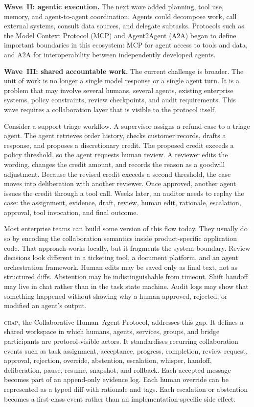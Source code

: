 \documentclass[11pt]{article}
\newcommand{\chap}{\textsc{chap}}
\begin{document}
\textbf{Wave~II: agentic execution.} The next wave added planning, tool use, memory, and agent-to-agent coordination. Agents could decompose work, call external systems, consult data sources, and delegate subtasks. Protocols such as the Model Context Protocol (MCP) and Agent2Agent (A2A) began to define important boundaries in this ecosystem: MCP for agent access to tools and data, and A2A for interoperability between independently developed agents.

\textbf{Wave~III: shared accountable work.} The current challenge is broader. The unit of work is no longer a single model response or a single agent turn. It is a problem that may involve several humans, several agents, existing enterprise systems, policy constraints, review checkpoints, and audit requirements. This wave requires a collaboration layer that is visible to the protocol itself.

Consider a support triage workflow. A supervisor assigns a refund case to a triage agent. The agent retrieves order history, checks customer records, drafts a response, and proposes a discretionary credit. The proposed credit exceeds a policy threshold, so the agent requests human review. A reviewer edits the wording, changes the credit amount, and records the reason as a goodwill adjustment. Because the revised credit exceeds a second threshold, the case moves into deliberation with another reviewer. Once approved, another agent issues the credit through a tool call. Weeks later, an auditor needs to replay the case: the assignment, evidence, draft, review, human edit, rationale, escalation, approval, tool invocation, and final outcome.

Most enterprise teams can build some version of this flow today. They usually do so by encoding the collaboration semantics inside product-specific application code. That approach works locally, but it fragments the system boundary. Review decisions look different in a ticketing tool, a document platform, and an agent orchestration framework. Human edits may be saved only as final text, not as structured diffs. Abstention may be indistinguishable from timeout. Shift handoff may live in chat rather than in the task state machine. Audit logs may show that something happened without showing why a human approved, rejected, or modified an agent's output.

\chap{}, the Collaborative Human--Agent Protocol, addresses this gap. It defines a shared workspace in which humans, agents, services, groups, and bridge participants are protocol-visible actors. It standardises recurring collaboration events such as task assignment, acceptance, progress, completion, review request, approval, rejection, override, abstention, escalation, whisper, handoff, deliberation, pause, resume, snapshot, and rollback. Each accepted message becomes part of an append-only evidence log. Each human override can be represented as a typed diff with rationale and tags. Each escalation or abstention becomes a first-class event rather than an implementation-specific side effect.
\end{document}
